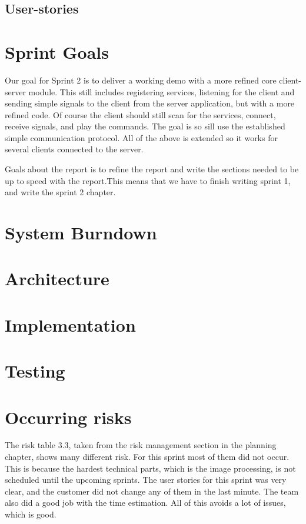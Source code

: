 \subsection{User-stories}

\section{Sprint Goals}
Our goal for Sprint 2 is to deliver a working demo with a more refined core client-server module. 
This still includes registering services, listening for the client and sending simple signals to the client from the server application, but with a more refined code. Of course the client should still scan for the services, connect, receive signals, and play the commands. 
The goal is so sill use the established simple communication protocol. All of the above is extended so it works for several clients connected to the server.

Goals about the report is to refine the report and write the sections needed to be up to speed with the report.This means that we have to finish writing sprint 1, and write the sprint 2 chapter. 
\section{System Burndown}
\section{Architecture}
\section{Implementation}
\section{Testing}


\section{Occurring risks}

The risk table 3.3, taken from the risk management section in the planning chapter, shows many different risk. 
For this sprint most of them did not occur. 
This is because the hardest technical parts, which is the image processing, is not scheduled until the upcoming sprints. 
The user stories for this sprint was very clear, and the customer did not change any of them in the last minute. The team also did a good job with the time estimation. All of this avoids a lot of issues, which is good. 


